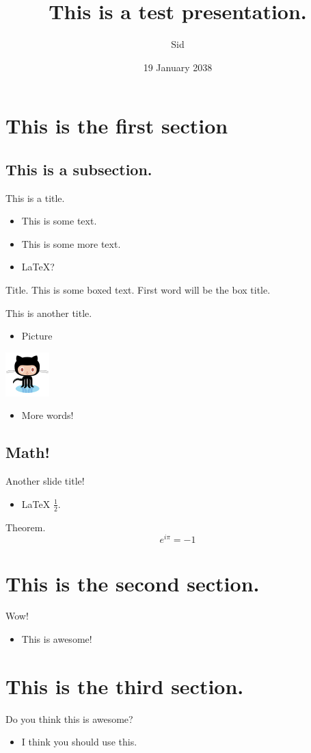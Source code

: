 \documentclass{beamer}
\title{This is a test presentation.}
\author{Sid}
\date{19 January 2038}
\begin{document}
\maketitle
\section{This is the first section}
\subsection{This is a subsection.}
\begin{frame}{This is a title.}
\begin{itemize}
\item This is some text.
\item This is some more text.
\item \LaTeX?
\end{itemize}
\begin{block}{Title.}
 This is some boxed text. First word will be the box title.
\end{block}
\end{frame}
\begin{frame}{This is another title.}
\begin{itemize}
\item Picture
\end{itemize}
\begin{center}\includegraphics{octocat.png}\end{center}
\begin{itemize}
\item More words!
\end{itemize}
\end{frame}
\subsection{Math!}
\begin{frame}{Another slide title!}
\begin{itemize}
\item LaTeX $\frac{1}{2}$.
\end{itemize}
\begin{block}{Theorem.}
 $$e^{i \pi} = -1$$
\end{block}
\end{frame}
\section{This is the second section.}
\begin{frame}{Wow!}
\begin{itemize}
\item This is awesome!
\end{itemize}
\end{frame}
\section{This is the third section.}
\begin{frame}{Do you think this is awesome?}
\begin{itemize}
\item I think you should use this.
\end{itemize}
\end{frame}
\end{document}
